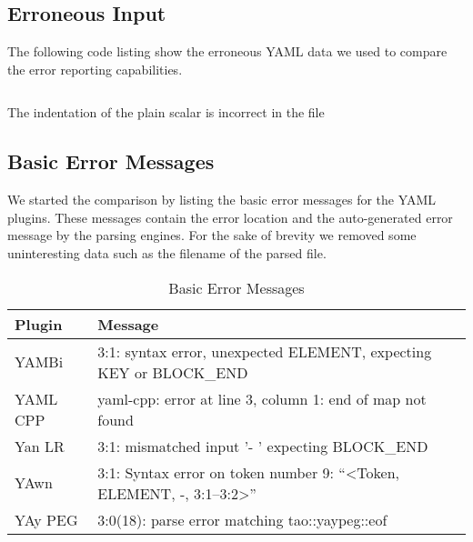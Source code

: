 \subsection{Erroneous Input}

The following code listing show the erroneous YAML data we used to compare the error reporting capabilities.

\begin{listing}
  \begin{code-boxed}
    \inputminted{yaml}{Data/Errors/list_element_outside.yaml}
  \end{code-boxed}
  \caption{The indentation of the plain scalar  is incorrect in the file }
\end{listing}

\subsection{Basic Error Messages}

We started the comparison by listing the basic error messages for the YAML plugins. These messages contain the error location and the auto-generated error message by the parsing engines. For the sake of brevity we removed some uninteresting data such as the filename of the parsed file.

\begin{table}
  \caption{Basic Error Messages}
  \label{tab:error_messages_list_element_outside}
  \centering
  \begin{tabular}{lp{12cm}}
    \toprule
    \textbf{Plugin} & \textbf{Message}\\
    \midrule
    YAMBi & 3:1: syntax error, unexpected ELEMENT, expecting KEY or BLOCK\_END\\
    YAML CPP & yaml-cpp: error at line 3, column 1: end of map not found\\
    Yan LR & 3:1: mismatched input '- ' expecting BLOCK\_END\\
    YAwn & 3:1: Syntax error on token number 9: “<Token, ELEMENT, -, 3:1–3:2>”\\
    YAy PEG & 3:0(18): parse error matching tao::yaypeg::eof\\
    \bottomrule
  \end{tabular}
\end{table}



